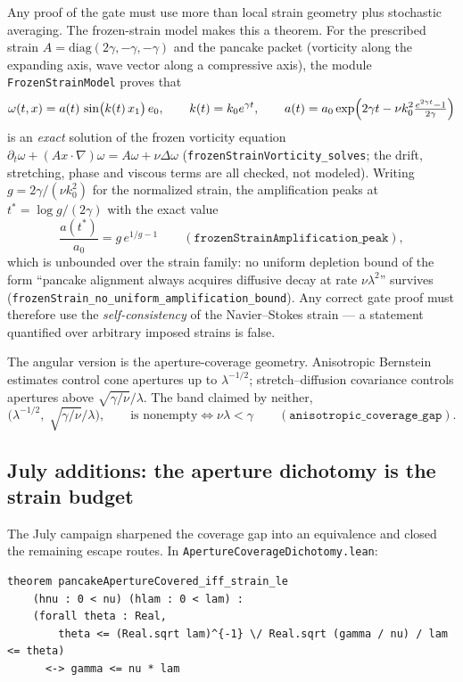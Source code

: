 \documentclass[11pt]{article}
\theoremstyle{definition}
\begin{document}
Any proof of the gate must use more than local strain geometry plus
stochastic averaging.  The frozen-strain model makes this a theorem.  For the
prescribed strain $A=\mathrm{diag}(2\gamma,-\gamma,-\gamma)$ and the pancake
packet (vorticity along the expanding axis, wave vector along a compressive
axis), the module \texttt{FrozenStrainModel} proves that
\[
  \omega(t,x) = a(t)\,\sin\bigl(k(t)\,x_1\bigr)\,e_0,
  \qquad
  k(t)=k_0e^{\gamma t},
  \qquad
  a(t)=a_0\exp\Bigl(2\gamma t - \nu k_0^2\tfrac{e^{2\gamma t}-1}{2\gamma}\Bigr)
\]
is an \emph{exact} solution of the frozen vorticity equation
$\partial_t\omega+(Ax\cdot\nabla)\omega=A\omega+\nu\Delta\omega$
(\texttt{frozenStrainVorticity\_solves}; the drift, stretching, phase and
viscous terms are all checked, not modeled).  Writing
$g=2\gamma/(\nu k_0^2)$ for the normalized strain, the amplification peaks at
$t^*=\log g/(2\gamma)$ with the exact value
\[
  \frac{a(t^*)}{a_0} = g\,e^{1/g-1}
  \qquad(\texttt{frozenStrainAmplification\_peak}),
\]
which is unbounded over the strain family: no uniform depletion bound of the
form ``pancake alignment always acquires diffusive decay at rate
$\nu\lambda^2$'' survives
(\texttt{frozenStrain\_no\_uniform\_amplification\_bound}).  Any correct gate
proof must therefore use the \emph{self-consistency} of the Navier--Stokes
strain --- a statement quantified over arbitrary imposed strains is false.

The angular version is the aperture-coverage geometry.  Anisotropic
Bernstein estimates control cone apertures up to $\lambda^{-1/2}$;
stretch--diffusion covariance controls apertures above
$\sqrt{\gamma/\nu}/\lambda$.  The band claimed by neither,
\[
  \bigl(\lambda^{-1/2},\; \sqrt{\gamma/\nu}/\lambda\bigr),
  \qquad\text{is nonempty}\iff \nu\lambda<\gamma
  \qquad(\texttt{anisotropic\_coverage\_gap}).
\]

\subsection{July additions: the aperture dichotomy is the strain budget}
\label{sec:aperture}

The July campaign sharpened the coverage gap into an equivalence and closed
the remaining escape routes.  In \texttt{ApertureCoverageDichotomy.lean}:

\begin{lstlisting}[language={}]
theorem pancakeApertureCovered_iff_strain_le
    (hnu : 0 < nu) (hlam : 0 < lam) :
    (forall theta : Real,
        theta <= (Real.sqrt lam)^{-1} \/ Real.sqrt (gamma / nu) / lam <= theta)
      <-> gamma <= nu * lam
\end{lstlisting}
\end{document}
